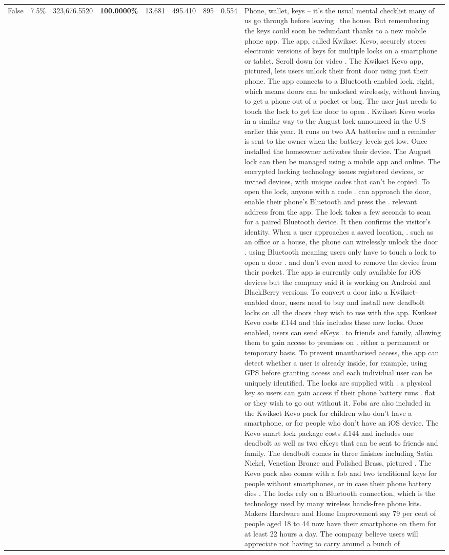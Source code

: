 \begin{table}[H]
\begin{tabular}{lllrlllll}
False & 7.5\% & 323,676.5520 & \bfseries \color{red} 100.0000\% & 13.681 & 495.410 & 895 & 0.554 & Phone, wallet, keys – it’s the usual mental checklist many of us go through before leaving  the house. But remembering the keys could soon be redundant thanks to a new mobile phone app. The app, called Kwikset Kevo, securely stores electronic versions of keys for multiple locks on a smartphone or tablet. Scroll down for video . The Kwikset Kevo app, pictured, lets users unlock their front door using just their phone. The app connects to a Bluetooth enabled lock, right, which means doors can be unlocked wirelessly, without having to get a phone out of a pocket or bag. The user just needs to touch the lock to get the door to open . Kwikset Kevo works in a similar way to the August lock announced in the U.S earlier this year. It runs on two AA batteries and a reminder is sent to the owner when the battery levels get low. Once installed the homeowner activates their device. The August lock can then be managed using a mobile app and online. The encrypted locking technology issues registered devices, or invited devices, with unique codes that can't be copied. To open the lock, anyone with a code . can approach the door, enable their phone's Bluetooth and press the . relevant address from the app. The lock takes a few seconds to scan for a paired Bluetooth device. It then confirms the visitor's identity. When a user approaches a saved location, . such as an office or a house, the phone can wirelessly unlock the door . using Bluetooth meaning users only have to touch a lock to open a door . and don't even need to remove the device from their pocket. The app is currently only available for iOS devices but the company said it is working on Android and BlackBerry versions. To convert a door into a Kwikset-enabled door, users need to buy and install new deadbolt locks on all the doors they wish to use with the app. Kwikset Kevo costs £144 and this includes these new locks. Once enabled, users can send eKeys . to friends and family, allowing them to gain access to premises on . either a permanent or temporary basis. To prevent unauthorised access, the app can detect whether a user is already inside, for example, using GPS before granting access and each individual user can be uniquely identified. The locks are supplied with . a physical key so users can gain access if their phone battery runs . flat or they wish to go out without it. Fobs are also included in the Kwikset Kevo pack for children who don't have a smartphone, or for people who don't have an iOS device. The Kevo smart lock package costs £144 and includes one deadbolt as well as two eKeys that can be sent to friends and family. The deadbolt comes in three finishes including Satin Nickel, Venetian Bronze and Polished Brass, pictured . The Kevo pack also comes with a fob and two traditional keys for people without smartphones, or in case their phone battery dies . The locks rely on a Bluetooth connection, which is the technology used by many wireless hands-free phone kits. Makers Hardware and Home Improvement say 79 per cent of people aged 18 to 44 now have their smartphone on them for at least 22 hours a day. The company believe users will appreciate not having to carry around a bunch of 
\end{tabular}
\end{table}
